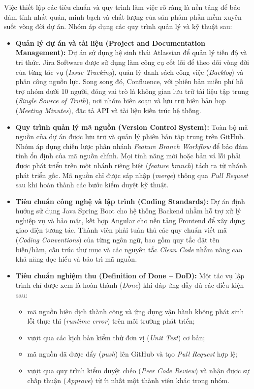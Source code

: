 Việc thiết lập các tiêu chuẩn và quy trình làm việc rõ ràng là nền tảng để bảo đảm tính nhất quán, minh bạch và chất lượng của sản phẩm phần mềm xuyên suốt vòng đời dự án. Nhóm áp dụng các quy trình quản lý và kỹ thuật sau:

\begin{itemize}
    \item \textbf{Quản lý dự án và tài liệu (Project and Documentation Management):} Dự án sử dụng hệ sinh thái Atlassian để quản lý tiến độ và tri thức. Jira Software được sử dụng làm công cụ cốt lõi để theo dõi vòng đời của từng tác vụ (\textit{Issue Tracking}), quản lý danh sách công việc (\textit{Backlog}) và phân công nguồn lực. Song song đó, Confluence, với phiên bản miễn phí hỗ trợ nhóm dưới 10 người, đóng vai trò là không gian lưu trữ tài liệu tập trung (\textit{Single Source of Truth}), nơi nhóm biên soạn và lưu trữ biên bản họp (\textit{Meeting Minutes}), đặc tả API và tài liệu kiến trúc hệ thống.

    \item \textbf{Quy trình quản lý mã nguồn (Version Control System):} Toàn bộ mã nguồn của dự án được lưu trữ và quản lý phiên bản tập trung trên GitHub. Nhóm áp dụng chiến lược phân nhánh \textit{Feature Branch Workflow} để bảo đảm tính ổn định của mã nguồn chính. Mọi tính năng mới hoặc bản vá lỗi phải được phát triển trên một nhánh riêng biệt (\textit{feature branch}) tách ra từ nhánh phát triển gốc. Mã nguồn chỉ được sáp nhập (\textit{merge}) thông qua \textit{Pull Request} sau khi hoàn thành các bước kiểm duyệt kỹ thuật.

    \item \textbf{Tiêu chuẩn công nghệ và lập trình (Coding Standards):} Dự án định hướng sử dụng Java Spring Boot cho hệ thống Backend nhằm hỗ trợ xử lý nghiệp vụ và bảo mật, kết hợp Angular cho nền tảng Frontend để xây dựng giao diện tương tác. Thành viên phải tuân thủ các quy chuẩn viết mã (\textit{Coding Conventions}) của từng ngôn ngữ, bao gồm quy tắc đặt tên biến/hàm, cấu trúc thư mục và các nguyên tắc \textit{Clean Code} nhằm nâng cao khả năng đọc hiểu và bảo trì mã nguồn.

    \item \textbf{Tiêu chuẩn nghiệm thu (Definition of Done -- DoD):} Một tác vụ lập trình chỉ được xem là hoàn thành (\textit{Done}) khi đáp ứng đầy đủ các điều kiện sau:
    \begin{itemize}
        \item mã nguồn biên dịch thành công và ứng dụng vận hành không phát sinh lỗi thực thi (\textit{runtime error}) trên môi trường phát triển;
        \item vượt qua các kịch bản kiểm thử đơn vị (\textit{Unit Test}) cơ bản;
        \item mã nguồn đã được đẩy (\textit{push}) lên GitHub và tạo \textit{Pull Request} hợp lệ;
        \item vượt qua quy trình kiểm duyệt chéo (\textit{Peer Code Review}) và nhận được sự chấp thuận (\textit{Approve}) từ ít nhất một thành viên khác trong nhóm.
    \end{itemize}
\end{itemize}

